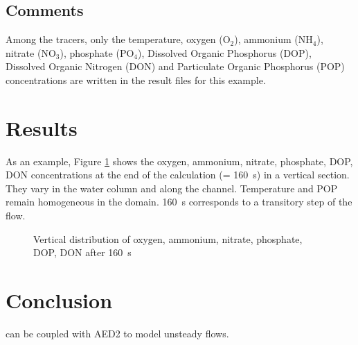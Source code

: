 \subsection{Comments}
Among the tracers, only the temperature, oxygen (O$_2$), ammonium (NH$_4$),
nitrate (NO$_3$), phosphate (PO$_4$), Dissolved Organic Phosphorus (DOP),
Dissolved Organic Nitrogen (DON) and Particulate Organic Phosphorus (POP)
concentrations are written in the result files for this example.

%
%
\section{Results}
%
As an example, Figure \ref{fig:waq3d_aed2_flume:res} shows the oxygen, ammonium,
nitrate, phosphate, DOP, DON concentrations at the end of the calculation (= 160~s)
in a vertical section.
They vary in the water column and along the channel.
Temperature and POP remain homogeneous in the domain.
160~s corresponds to a transitory step of the flow.


\begin{figure} [H]
\centering
 \caption{Vertical distribution of oxygen, ammonium, nitrate, phosphate, DOP, DON after 160~s}
 \label{fig:waq3d_aed2_flume:res}
\end{figure}
%
\section{Conclusion}
%
 can be coupled with AED2 to model unsteady flows.
%
